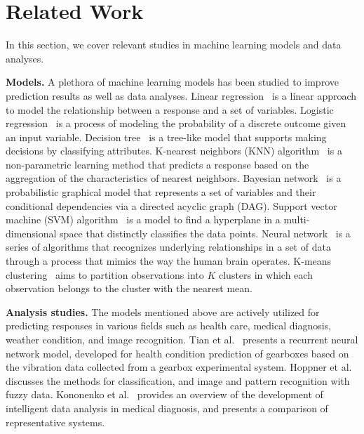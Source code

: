 \section{Related Work}
\label{sec:related}

In this section, we cover relevant studies in machine learning models and data analyses.

\textbf{Models.}
A plethora of machine learning models has been studied to improve prediction results as well as data analyses.
Linear regression~\cite{linear} is a linear approach to model the relationship between a response and a set of variables.
Logistic regression~\cite{logistic} is a process of modeling the probability of a discrete outcome given an input variable.
Decision tree~\cite{decisiontree} is a tree-like model that supports making decisions by classifying attributes.
K-nearest neighbors (KNN) algorithm~\cite{knn} is a non-parametric learning method that predicts a response based on the aggregation of the characteristics of nearest neighbors.
Bayesian network~\cite{bayesian} is a probabilistic graphical model that represents a set of variables and their conditional dependencies via a directed acyclic graph (DAG).
Support vector machine (SVM) algorithm~\cite{svm} is a model to find a hyperplane in a multi-dimensional space that distinctly classifies the data points.
Neural network~\cite{neuralnetwork} is a series of algorithms that recognizes underlying relationships in a set of data through a process that mimics the way the human brain operates.
K-means clustering~\cite{kmeans} aims to partition observations into $K$ clusters in which each observation belongs to the cluster with the nearest mean.

\textbf{Analysis studies.}
The models mentioned above are actively utilized for predicting responses in various fields such as health care, medical diagnosis, weather condition, and image recognition.
Tian et al.~\cite{health_nn} presents a recurrent neural network model, developed for health condition prediction of gearboxes based on the vibration data collected from a gearbox experimental system.
Hoppner et al.~\cite{imagerecognition} discusses the methods for classification, and image and pattern recognition with fuzzy data.
Kononenko et al.~\cite{medicaldiagnosis} provides an overview of the development of intelligent data analysis in medical diagnosis, and presents a comparison of representative systems.